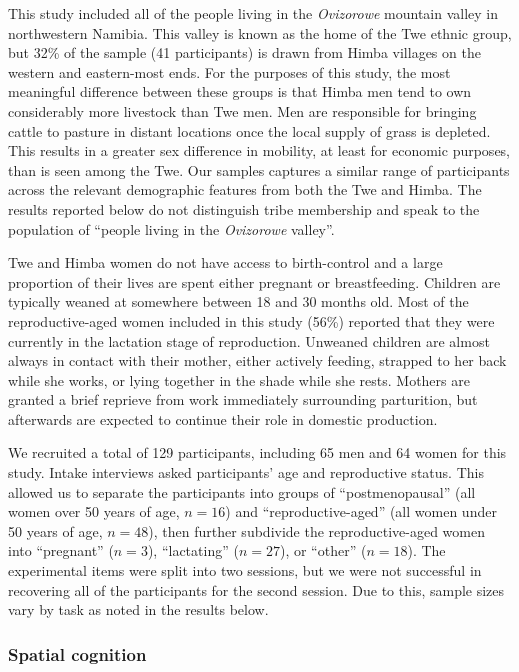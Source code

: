 This study included all of the people living in the \emph{Ovizorowe} mountain valley in northwestern Namibia.  This valley is known as the home of the Twe ethnic group, but 32\% of the sample (41 participants) is drawn from Himba villages on the western and eastern-most ends.  For the purposes of this study, the most meaningful difference between these groups is that Himba men tend to own considerably more livestock than Twe men.  Men are responsible for bringing cattle to pasture in distant locations once the local supply of grass is depleted.  This results in a greater sex difference in mobility, at least for economic purposes, than is seen among the Twe.  Our samples captures a similar range of participants across the relevant demographic features from both the Twe and Himba.  The results reported below do not distinguish tribe membership and speak to the population of ``people living in the \emph{Ovizorowe} valley''.

Twe and Himba women do not have access to birth-control and a large proportion of their lives are spent either pregnant or breastfeeding.  Children are typically weaned at somewhere between 18 and 30 months old.  Most of the reproductive-aged women included in this study (56\%) reported that they were currently in the lactation stage of reproduction.  Unweaned children are almost always in contact with their mother, either actively feeding, strapped to her back while she works, or lying together in the shade while she rests.  Mothers are granted a brief reprieve from work immediately surrounding parturition, but afterwards are expected to continue their role in domestic production.

We recruited a total of 129 participants, including 65 men and 64 women for this study.  Intake interviews asked participants' age and reproductive status.  This allowed us to separate the participants into groups of ``postmenopausal'' (all women over 50 years of age, $n = 16$) and ``reproductive-aged'' (all women under 50 years of age, $n = 48$), then further subdivide the reproductive-aged women into ``pregnant'' ($n = 3$), ``lactating'' ($n = 27$), or ``other'' ($n = 18$).  The experimental items were split into two sessions, but we were not successful in recovering all of the participants for the second session.  Due to this, sample sizes vary by task as noted in the results below.

		\subsubsection{Spatial cognition}
		\label{sec:2.2.1}		
